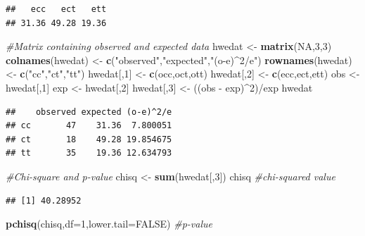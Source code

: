 \documentclass[]{article}
\newenvironment{Shaded}{\begin{snugshade}}{\end{snugshade}}
\newcommand{\KeywordTok}[1]{\textcolor[rgb]{0.13,0.29,0.53}{\textbf{{#1}}}}
\newcommand{\DataTypeTok}[1]{\textcolor[rgb]{0.13,0.29,0.53}{{#1}}}
\newcommand{\DecValTok}[1]{\textcolor[rgb]{0.00,0.00,0.81}{{#1}}}
\newcommand{\StringTok}[1]{\textcolor[rgb]{0.31,0.60,0.02}{{#1}}}
\newcommand{\CommentTok}[1]{\textcolor[rgb]{0.56,0.35,0.01}{\textit{{#1}}}}
\newcommand{\OtherTok}[1]{\textcolor[rgb]{0.56,0.35,0.01}{{#1}}}
\newcommand{\NormalTok}[1]{{#1}}
\begin{document}
\begin{verbatim}
##   ecc   ect   ett 
## 31.36 49.28 19.36
\end{verbatim}

\begin{Shaded}
\begin{Highlighting}[]
\CommentTok{#Matrix containing observed and expected data}
\NormalTok{hwedat <-}\StringTok{ }\KeywordTok{matrix}\NormalTok{(}\OtherTok{NA}\NormalTok{,}\DecValTok{3}\NormalTok{,}\DecValTok{3}\NormalTok{)}
\KeywordTok{colnames}\NormalTok{(hwedat) <-}\StringTok{ }\KeywordTok{c}\NormalTok{(}\StringTok{"observed"}\NormalTok{,}\StringTok{"expected"}\NormalTok{,}\StringTok{"(o-e)^2/e"}\NormalTok{)}
\KeywordTok{rownames}\NormalTok{(hwedat) <-}\StringTok{ }\KeywordTok{c}\NormalTok{(}\StringTok{"cc"}\NormalTok{,}\StringTok{"ct"}\NormalTok{,}\StringTok{"tt"}\NormalTok{)}
\NormalTok{hwedat[,}\DecValTok{1}\NormalTok{] <-}\StringTok{ }\KeywordTok{c}\NormalTok{(occ,oct,ott)}
\NormalTok{hwedat[,}\DecValTok{2}\NormalTok{] <-}\StringTok{ }\KeywordTok{c}\NormalTok{(ecc,ect,ett)}
\NormalTok{obs <-}\StringTok{ }\NormalTok{hwedat[,}\DecValTok{1}\NormalTok{]}
\NormalTok{exp <-}\StringTok{ }\NormalTok{hwedat[,}\DecValTok{2}\NormalTok{]}
\NormalTok{hwedat[,}\DecValTok{3}\NormalTok{] <-}\StringTok{ }\NormalTok{((obs -}\StringTok{ }\NormalTok{exp)^}\DecValTok{2}\NormalTok{)/exp}
\NormalTok{hwedat}
\end{Highlighting}
\end{Shaded}

\begin{verbatim}
##    observed expected (o-e)^2/e
## cc       47    31.36  7.800051
## ct       18    49.28 19.854675
## tt       35    19.36 12.634793
\end{verbatim}

\begin{Shaded}
\begin{Highlighting}[]
\CommentTok{#Chi-square and p-value}
\NormalTok{chisq <-}\StringTok{ }\KeywordTok{sum}\NormalTok{(hwedat[,}\DecValTok{3}\NormalTok{])}
\NormalTok{chisq                               }\CommentTok{#chi-squared value}
\end{Highlighting}
\end{Shaded}

\begin{verbatim}
## [1] 40.28952
\end{verbatim}

\begin{Shaded}
\begin{Highlighting}[]
\KeywordTok{pchisq}\NormalTok{(chisq,}\DataTypeTok{df=}\DecValTok{1}\NormalTok{,}\DataTypeTok{lower.tail=}\OtherTok{FALSE}\NormalTok{) }\CommentTok{#p-value}
\end{Highlighting}
\end{Shaded}
\end{document}
